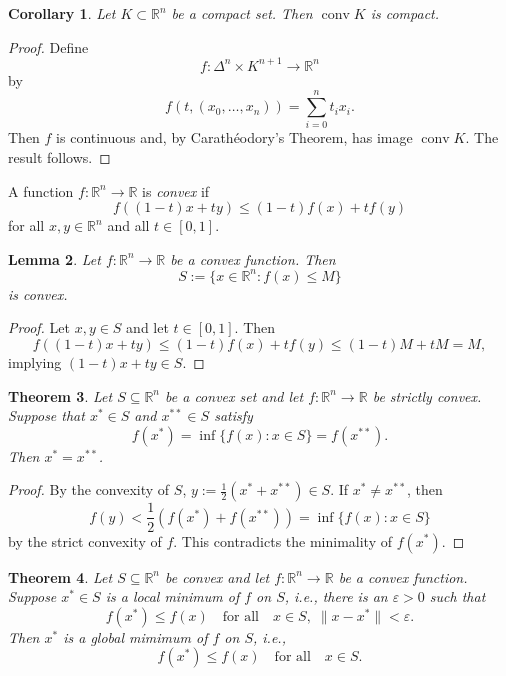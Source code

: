 \documentclass[12pt]{amsart}
\newtheorem{theorem}{Theorem}[section]
\newtheorem{lemma}[theorem]{Lemma}
\newtheorem{corollary}[theorem]{Corollary}
\theoremstyle{definition}
\theoremstyle{remark}
\numberwithin{equation}{section}
\renewcommand{\epsilon}{\varepsilon}
\newcommand{\RR}{\mathbb{R}}
\DeclareMathOperator{\conv}{conv}
\begin{document}
\begin{corollary}
    Let $K\subset\RR^n$ be a compact set. Then $\conv K$ is compact.
\end{corollary}

\begin{proof}
    Define
    \[
        f:\Delta^n\times K^{n+1}\longrightarrow \RR^n
    \]
    by
    \[
        f(t, (x_0,\ldots,x_n)) = \sum_{i=0}^nt_ix_i.
    \]
    Then $f$ is continuous and, by Carath\'eodory's Theorem,
    has image $\conv K$. The result follows.
\end{proof}

A function $f:\RR^n\to\RR$ is \emph{convex} if
\[
    f((1-t)x + ty)\leq (1-t)f(x) + tf(y)
\]
for all $x,y\in\RR^n$ and all $t\in[0, 1]$.

\begin{lemma}
    Let $f:\RR^n\to\RR$ be a convex function. Then
    \[
        S:=\{x\in\RR^n : f(x)\leq M\}
    \]
    is convex.
\end{lemma}

\begin{proof}
    Let $x, y\in S$ and let $t\in[0, 1]$.
    Then
    \[
        f((1-t)x + ty)\leq (1-t)f(x) + tf(y) \leq (1-t)M + tM = M,
    \]
    implying $(1-t)x+ty\in S$.
\end{proof}

\begin{theorem}
    Let $S\subseteq\RR^n$ be a convex set and
    let $f:\RR^n\to\RR$ be strictly convex.
    Suppose that $x^*\in S$ and $x^{**}\in S$ satisfy
    \[
        f(x^*) = \inf\{f(x) : x\in S\} = f(x^{**}).
    \]
    Then $x^*=x^{**}$.
\end{theorem}

\begin{proof}
    By the convexity of $S$, $y:=\frac12(x^*+x^{**})\in S$.
    If $x^*\neq x^{**}$, then
    \[
        f(y) < \frac12(f(x^*) + f(x^{**})) = \inf\{f(x): x\in S\}
    \]
    by the strict convexity of $f$.
    This contradicts the minimality of $f(x^*)$.
\end{proof}

\begin{theorem}
    Let $S\subseteq\RR^n$ be convex and let $f:\RR^n\to\RR$ be
    a convex function.
    Suppose $x^*\in S$ is a local minimum of $f$ on $S$, i.e.,
    there is an $\epsilon > 0$ such that
    \[
        f(x^*)\leq f(x) \quad\text{for all}\quad
        x\in S,\; \|x-x^*\|<\epsilon.
    \]
    Then $x^*$ is a global mimimum of $f$ on $S$, i.e.,
    \[
        f(x^*)\leq f(x) \quad\text{for all}\quad
        x\in S.
    \]
\end{theorem}
\end{document}
